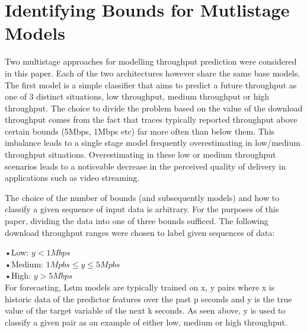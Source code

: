 \section{Identifying Bounds for Mutlistage Models}
\label{sec:bounds}
Two multistage approaches for modelling throughput prediction were considered in this paper. Each of the two architectures however share the same base models. The first model is a simple classifier that aims to predict a future throughput as one of 3 distinct situations, low throughput, medium throughput or high throughput. The choice to divide the problem based on the value of the download throughput comes from the fact that traces typically reported throughput above certain bounds (5Mbps, 1Mbps etc) far more often than below them. This imbalance leads to a single stage model frequently overestimating in low/medium throughput situations. Overestimating in these low or medium throughput scenarios leads to a noticeable decrease in the perceived quality of delivery in applications such as video streaming. 

The choice of the number of bounds (and subsequently models) and how to classify a given sequence of input data is arbitrary. For the purposes of this paper, dividing the data into one of three bounds sufficed. The following download throughput ranges were chosen to label given sequences of data:

•Low: $ y< 1Mbps$ \\
•Medium: $1Mpbs \leq y \leq 5Mpbs$ \\
•High: $y > 5Mbps$ \\

For forecasting, Lstm models are typically trained on x, y pairs where x is historic data of the predictor features over the past p seconds and y is the true value of the target variable of the next k seconds. As seen above, y is used to classify a given pair as an example of either low, medium or high throughput.